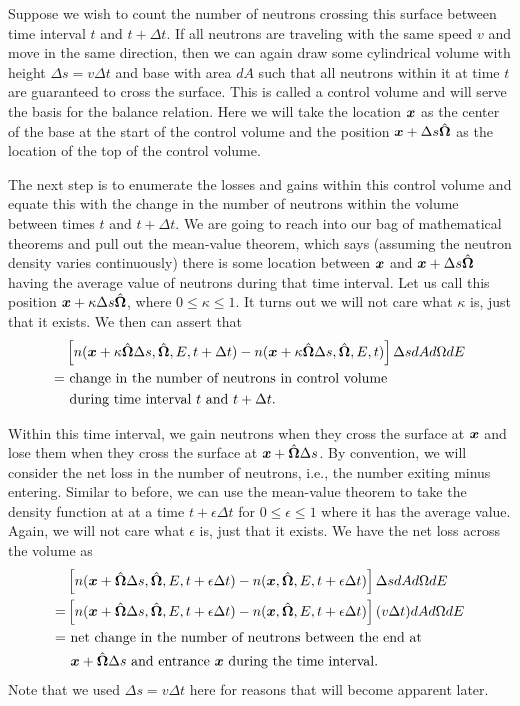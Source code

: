 Suppose we wish to count the number of neutrons crossing this surface between time interval $t$ and $t + \Delta t$. If all neutrons are traveling with the same speed $v$ and move in the same direction, then we can again draw some cylindrical volume with height $\Delta s = v \Delta t$ and base with area $dA$ such that all neutrons within it at time $t$ are guaranteed to cross the surface. This is called a control volume and will serve the basis for the balance relation. Here we will take the location $\bm{x}$ as the center of the base at the start of the control volume and the position $\bm{x} + \Delta s \hat{\mathbf{\Omega}}$ as the location of the top of the control volume. 

The next step is to enumerate the losses and gains within this control volume and equate this with the change in the number of neutrons within the volume between times $t$ and $t + \Delta t$. We are going to reach into our bag of mathematical theorems and pull out the mean-value theorem, which says (assuming the neutron density varies continuously) there is some location between $\bm{x}$ and $\bm{x} + \Delta s \hat{\mathbf{\Omega}}$ having the average value of neutrons during that time interval. Let us call this position $\bm{x} + \kappa \Delta s \hat{\mathbf{\Omega}}$, where $0 \le \kappa \le 1$. It turns out we will not care what $\kappa$ is, just that it exists. We then can assert that
\begin{align}
  &\left[ n( \bm{x} + \kappa \hat{\mathbf{\Omega}} \Delta s , \hat{\mathbf{\Omega}}, E, t + \Delta t ) - n( \bm{x} + \kappa \hat{\mathbf{\Omega}}  \Delta s , \hat{\mathbf{\Omega}}, E, t ) \right] \Delta s dA d\Omega dE \nonumber \\*
  = &\text{ change in the number of neutrons in control volume} \nonumber \\*
  	&\text{ during time interval $t$ and $t + \Delta t$.} 
\end{align} 

Within this time interval, we gain neutrons when they cross the surface at $\bm{x}$ and lose them when they cross the surface at $\bm{x} + \hat{\mathbf{\Omega}} \Delta s$. By convention, we will consider the net loss in the number of neutrons, i.e., the number exiting minus entering. Similar to before, we can use the mean-value theorem to take the density function at at a time $t + \epsilon \Delta t$ for $0 \le \epsilon \le 1$ where it has the average value. Again, we will not care what $\epsilon$ is, just that it exists. We have the net loss across the volume as 
\begin{align}
  &\left[ n( \bm{x} + \hat{\mathbf{\Omega}} \Delta s , \hat{\mathbf{\Omega}}, E, t + \epsilon \Delta t ) - n( \bm{x} , \hat{\mathbf{\Omega}}, E, t + \epsilon  \Delta t ) \right] \Delta s dA d\Omega dE \nonumber \\*
  =  &\left[ n( \bm{x} + \hat{\mathbf{\Omega}} \Delta s , \hat{\mathbf{\Omega}}, E, t + \epsilon  \Delta t ) - n( \bm{x} , \hat{\mathbf{\Omega}}, E, t + \epsilon  \Delta t ) \right]  ( v \Delta t ) dA d\Omega dE \nonumber \\*
  = &\text{ net change in the number of neutrons between the end at } \nonumber \\*
  	&\text{ $\bm{x} + \hat{\mathbf{\Omega}} \Delta s$ and entrance $\bm{x}$ during the time interval.}
\end{align} 
Note that we used $\Delta s = v \Delta t$ here for reasons that will become apparent later.

